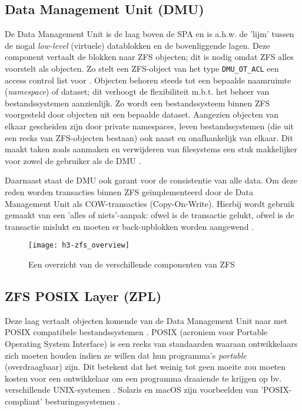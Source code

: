 
\subsection{Data Management Unit (DMU)}

De Data Management Unit is de laag boven de SPA en is a.h.w. de 'lijm' tussen de nogal \textit{low-level} (virtuele) datablokken en de bovenliggende lagen. Deze component vertaalt de blokken naar ZFS objecten; dit is nodig omdat ZFS alles voorstelt als objecten. Zo stelt een ZFS-object van het type \texttt{DMU\_OT\_ACL} een access control list voor \autocite{Microsystems2006}. Objecten behoren steeds tot een bepaalde naamruimte (\textit{namespace}) of dataset; dit verhoogt de flexibiliteit m.b.t. het beheer van bestandssystemen aanzienlijk. Zo wordt een bestandssysteem binnen ZFS voorgesteld door objecten uit een bepaalde dataset. Aangezien objecten van elkaar gescheiden zijn door private namespaces, leven bestandssystemen (die uit een reeks van ZFS-objecten bestaan) ook naast en onafhankelijk van elkaar. Dit maakt taken zoals aanmaken en verwijderen van filesystems een stuk makkelijker voor zowel de gebruiker als de DMU \autocite{ZFSBonwick}.   

Daarnaast staat de DMU ook garant voor de consistentie van alle data. Om deze reden worden transacties binnen ZFS geïmplementeerd door de Data Management Unit als COW-transacties (Copy-On-Write). Hierbij wordt gebruik gemaakt van een 'alles of niets'-aanpak: ofwel is de transactie gelukt, ofwel is de transactie mislukt en moeten er back-upblokken worden aangewend \autocite{ZFSBonwick}.

\begin{figure}
        \centering
        \texttt{[image: h3-zfs\_overview]}
        \caption{Een overzicht van de verschillende componenten van ZFS \autocite{KendiOnbekend}}
        \label{fig:kendi_zfs_overview}
\end{figure}

\subsection{ZFS POSIX Layer (ZPL)}

Deze laag vertaalt objecten komende van de Data Management Unit naar met POSIX compatibele bestandssystemen \autocite{ZFSBonwick}. POSIX (acroniem voor Portable Operating System Interface) is een reeks van standaarden waaraan ontwikkelaars zich moeten houden indien ze willen dat hun programma's \textit{portable} (overdraagbaar) zijn. Dit betekent dat het weinig tot geen moeite zou moeten kosten voor een ontwikkelaar om een programma draaiende te krijgen op bv. verschillende UNIX-systemen \autocite{IEEE2016}. Solaris en macOS zijn voorbeelden van 'POSIX-compliant' besturingssystemen \autocite{GroupOnbekend}.

